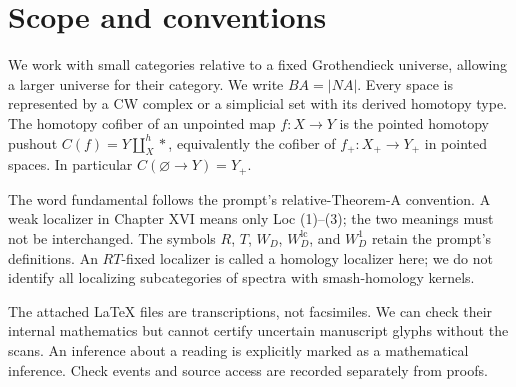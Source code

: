 \section*{Scope and conventions}
We work with small categories relative to a fixed Grothendieck universe, allowing a larger universe for their category. We write $BA=|NA|$. Every space is represented by a CW complex or a simplicial set with its derived homotopy type. The homotopy cofiber of an unpointed map $f:X\to Y$ is the pointed homotopy pushout $C(f)=Y\amalg_X^h *$, equivalently the cofiber of $f_+:X_+\to Y_+$ in pointed spaces. In particular $C(\varnothing\to Y)=Y_+$.

The word fundamental follows the prompt's relative-Theorem-A convention. A weak localizer in Chapter XVI means only Loc (1)--(3); the two meanings must not be interchanged. The symbols $R$, $T$, $W_D$, $W_D^{\mathrm{lc}}$, and $W_D^1$ retain the prompt's definitions. An $RT$-fixed localizer is called a homology localizer here; we do not identify all localizing subcategories of spectra with smash-homology kernels.

The attached LaTeX files are transcriptions, not facsimiles. We can check their internal mathematics but cannot certify uncertain manuscript glyphs without the scans. An inference about a reading is explicitly marked as a mathematical inference. Check events and source access are recorded separately from proofs.
